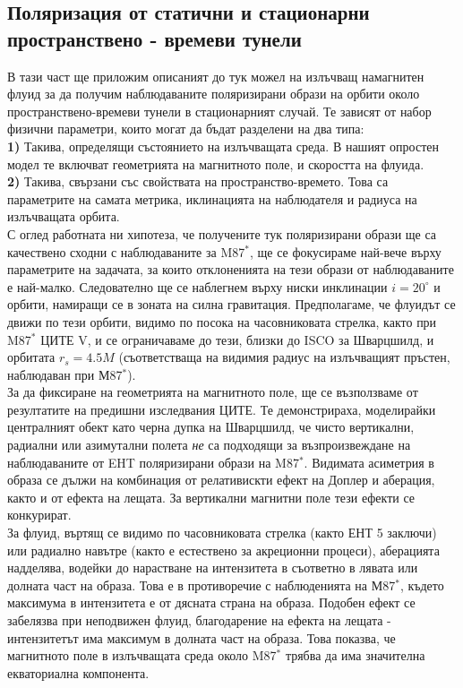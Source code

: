 \subsection{Поляризация от статични и стационарни пространствено - времеви тунели}
В тази част ще приложим описаният до тук можел на излъчващ намагнитен флуид за да получим наблюдаваните поляризирани образи на орбити около пространствено-времеви тунели в стационарният случай. Те зависят от набор физични параметри, които могат да бъдат разделени на два типа:\\

\textbf{1)} Такива, определящи състоянието на излъчващата среда. В нашият опростен модел те включват геометрията на магнитното поле, и скоростта на флуида.\\

\textbf{2)} Такива, свързани със свойствата на пространство-времето. Това са параметрите на самата метрика, иклинацията на наблюдателя и радиуса на излъчващата орбита.\\

С оглед работната ни хипотеза, че получените тук поляризирани образи ще са качествено сходни с наблюдаваните за M87$^*$, ще се фокусираме най-вече върху параметрите на задачата, за които отклоненията на тези образи от наблюдаваните е най-малко. Следователно ще се наблегнем върху ниски инклинации $i = 20^\circ$ и орбити, намиращи се в зоната на силна гравитация. Предполагаме, че флуидът се движи по тези орбити, видимо по посока на часовниковата стрелка, както при M87$^*$ ЦИТЕ V, и се ограничаваме до тези, близки до ISCO за Шварцшилд, и орбитата $r_s = 4.5M$ (съответстваща на видимия радиус на излъчващият пръстен, наблюдаван при М87$^*$). \\

За да фиксиране на геометрията на магнитното поле, ще се възползваме от резултатите на предишни изследвания ЦИТЕ. Те демонстрираха, моделирайки централният обект като черна дупка на Шварцшилд, че чисто вертикални, радиални или азимутални полета \emph{не} са подходящи за възпроизвеждане на наблюдаваните от EHT поляризирани образи на M87$^*$. Видимата асиметрия в образа се дължи на комбинация от релативискти ефект на Доплер и аберация, както и от ефекта на лещата. За вертикални магнитни поле тези ефекти се конкурират.\\

За флуид, въртящ се видимо по часовниковата стрелка (както ЕНТ 5 заключи) или радиално навътре (както е естествено за акреционни процеси), аберацията надделява, водейки до нарастване на интензитета в съответно в лявата или долната част на образа. Това е в противоречие с наблюденията на М87$^*$, където максимума в интензитета е от дясната страна на образа. Подобен ефект се забелязва при неподвижен флуид, благодарение на ефекта на лещата - интензитетът има максимум в долната част на образа. Това показва, че магнитното поле в излъчващата среда около M87$^*$ трябва да има значителна екваториална компонента. \\

